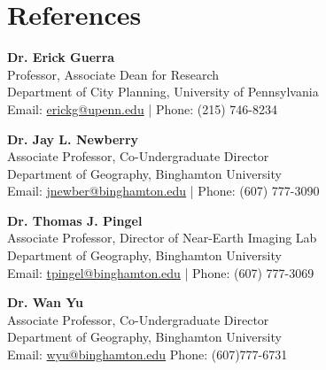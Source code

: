 \documentclass[11pt]{article}
\begin{document}
\section*{References}
\noindent
\textbf{Dr. Erick Guerra} \\
Professor, Associate Dean for Research \\
Department of City Planning, University of Pennsylvania \\
Email: \href{mailto:erickg@upenn.edu}{erickg@upenn.edu} \quad | \quad Phone: (215) 746-8234

\vspace{2mm}
\noindent
\textbf{Dr. Jay L. Newberry} \\
Associate Professor, Co-Undergraduate Director \\
Department of Geography, Binghamton University \\
Email: \href{mailto:jnewber@binghamton.edu}{jnewber@binghamton.edu} | Phone: (607) 777-3090

\vspace{2mm}
\noindent
\textbf{Dr. Thomas J. Pingel} \\
Associate Professor, Director of Near-Earth Imaging Lab \\
Department of Geography, Binghamton University \\
Email: \href{mailto:tpingel@binghamton.edu}{tpingel@binghamton.edu} \quad | \quad Phone: (607) 777-3069

\vspace{2mm}
\noindent
\textbf{Dr. Wan Yu} \\
Associate Professor, Co-Undergraduate Director \\
Department of Geography, Binghamton University \\
Email: \href{mailto:wyu@binghamton.edu}{wyu@binghamton.edu} 
Phone: (607)777-6731
\end{document}
